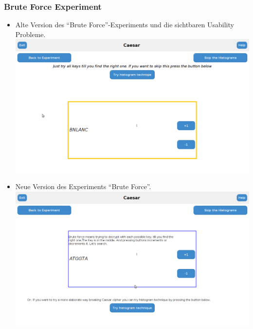 \documentclass{article}
\begin{document}
  \subsubsection{Brute Force Experiment}
   \begin{itemize}
    \item Alte Version des ``Brute Force''-Experiments und die sichtbaren Usability Probleme.\newline
          \includegraphics[width=15cm]{resources/bruteForceUsability.png}
    \newpage
    \item Neue Version des Experiments ``Brute Force''.\newline
          \includegraphics[width=15cm]{resources/bruteForceFix.png}
   \end{itemize}
\end{document}

